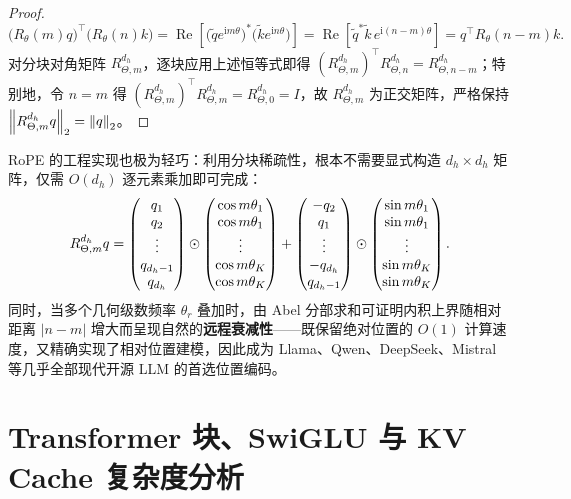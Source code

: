 \begin{thmBox}
\begin{proof}
\[
  \big(R_\theta(m) q\big)^\top \big(R_\theta(n) k\big)
  = \operatorname{Re}\!\left[\big(\tilde{q} e^{\mathrm{i}m\theta}\big)^* \big(\tilde{k} e^{\mathrm{i}n\theta}\big)\right]
  = \operatorname{Re}\!\left[\tilde{q}^* \tilde{k}\, e^{\mathrm{i}(n-m)\theta}\right]
  = q^\top R_\theta(n - m) k.
\]
对分块对角矩阵 $R_{\Theta, m}^{d_h}$，逐块应用上述恒等式即得 $(R_{\Theta, m}^{d_h})^\top R_{\Theta, n}^{d_h} = R_{\Theta, n-m}^{d_h}$；特别地，令 $n = m$ 得 $(R_{\Theta, m}^{d_h})^\top R_{\Theta, m}^{d_h} = R_{\Theta, 0}^{d_h} = I$，故 $R_{\Theta, m}^{d_h}$ 为正交矩阵，严格保持 $\left\|R_{\Theta, m}^{d_h} q\right\|_2 = \left\|q\right\|_2$。
\end{proof}
\end{thmBox}

RoPE 的工程实现也极为轻巧：利用分块稀疏性，根本不需要显式构造 $d_h \times d_h$ 矩阵，仅需 $O(d_h)$ 逐元素乘加即可完成：
\[
  R_{\Theta, m}^{d_h} q
  = \begin{pmatrix} q_1 \\ q_2 \\ \vdots \\ q_{d_h-1} \\ q_{d_h} \end{pmatrix}
  \odot \begin{pmatrix} \cos m\theta_1 \\ \cos m\theta_1 \\ \vdots \\ \cos m\theta_K \\ \cos m\theta_K \end{pmatrix}
  + \begin{pmatrix} -q_2 \\ q_1 \\ \vdots \\ -q_{d_h} \\ q_{d_h-1} \end{pmatrix}
  \odot \begin{pmatrix} \sin m\theta_1 \\ \sin m\theta_1 \\ \vdots \\ \sin m\theta_K \\ \sin m\theta_K \end{pmatrix}.
\]
同时，当多个几何级数频率 $\theta_r$ 叠加时，由 Abel 分部求和可证明内积上界随相对距离 $|n - m|$ 增大而呈现自然的\textbf{远程衰减性}——既保留绝对位置的 $O(1)$ 计算速度，又精确实现了相对位置建模，因此成为 Llama、Qwen、DeepSeek、Mistral 等几乎全部现代开源 LLM 的首选位置编码。

\section{Transformer 块、SwiGLU 与 KV Cache 复杂度分析}
\label{sec:block-kvcache}

